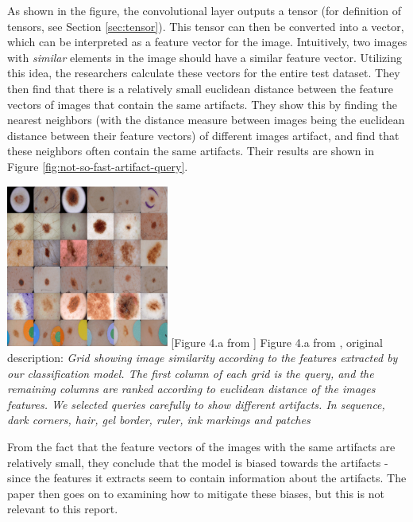 As shown in the figure, the convolutional layer outputs a tensor (for definition of tensors, see Section \ref{sec:tensor}).
This tensor can then be converted into a vector, which can be interpreted as a feature vector for the image.
Intuitively, two images with \textit{similar} elements in the image should have a similar feature vector.
Utilizing this idea, the researchers calculate these vectors for the entire test dataset.
They then find that there is a relatively small euclidean distance between the feature vectors of images
that contain the same artifacts.
They show this by finding the nearest neighbors (with the distance measure between images being the euclidean distance between their feature vectors)
of different images artifact, and find that these neighbors often contain the same artifacts.
Their results are shown in Figure \ref{fig:not-so-fast-artifact-query}.


\begin{center}
    \includegraphics[width=0.4\textwidth]{images/not-so-fast-artifact-query.png}
    [Figure 4.a from \cite{debias-not-so-fast}]{
            Figure 4.a from \cite{debias-not-so-fast}, original description: \textit{Grid showing image similarity according to the features extracted by our classification model. The first column
            of each grid is the query, and the remaining columns are ranked according to euclidean distance of the images features.
            We selected queries carefully to show different artifacts.
            In sequence, dark corners, hair, gel border, ruler, ink markings and patches}}
    \label{fig:not-so-fast-artifact-query}
\end{center}

From the fact that the feature vectors of the images with the same artifacts are relatively small,
they conclude that the model is biased towards the artifacts - since the features it extracts seem to contain information about the artifacts.
The paper then goes on to examining how to mitigate these biases, but this is not relevant to this report.